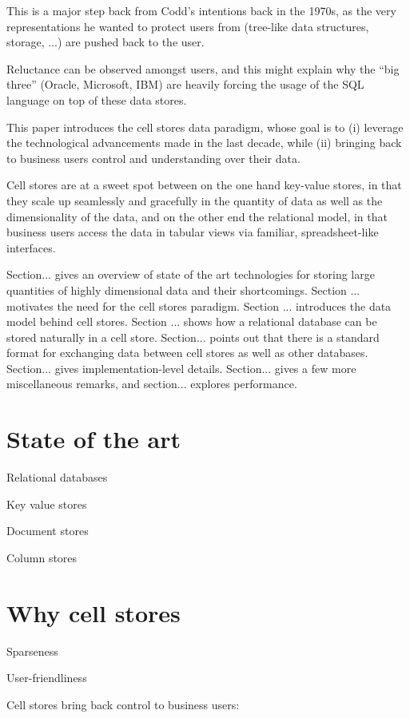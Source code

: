 \documentclass{vldb}
\begin{document}
This is a major step back from Codd's intentions back in the 1970s, as the very representations he wanted to protect users from (tree-like data structures, storage, ...) are pushed back to the user.

Reluctance can be observed amongst users, and this might explain why the ``big three'' (Oracle, Microsoft, IBM) are heavily forcing the usage of the SQL language on top of these data stores.

This paper introduces the cell stores data paradigm, whose goal is to (i) leverage the technological advancements made in the last decade, while (ii) bringing back to business users control and understanding over their data.

Cell stores are at a sweet spot between on the one hand key-value stores, in that they scale up seamlessly and gracefully in the quantity of data as well as the dimensionality of the data, and on the other end the relational model, in that business users access the data in tabular views via familiar, spreadsheet-like interfaces.

Section... gives an overview of state of the art technologies for storing large quantities of highly dimensional data and their shortcomings. Section ... motivates the need for the cell stores paradigm. Section ... introduces the data model behind cell stores. Section ... shows how a relational database can be stored naturally in a cell store. Section... points out that there is a standard format for exchanging data between cell stores as well as other databases. Section... gives implementation-level details. Section... gives a few more miscellaneous remarks, and section... explores performance.

\section{State of the art}
Relational databases

Key value stores

Document stores

Column stores

\section{Why cell stores}

Sparseness

User-friendliness

Cell stores bring back control to business users:
\end{document}

